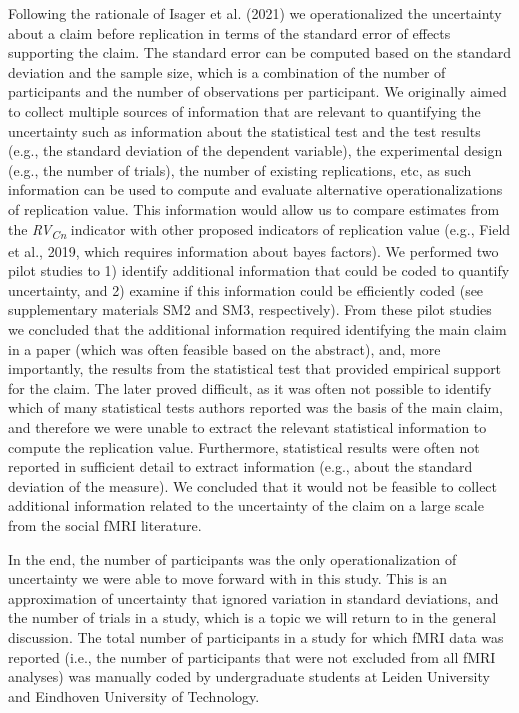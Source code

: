\documentclass[
  man,floatsintext]{apa6}
\begin{document}
Following the rationale of Isager et al. (2021) we operationalized the uncertainty about a claim before replication in terms of the standard error of effects supporting the claim. The standard error can be computed based on the standard deviation and the sample size, which is a combination of the number of participants and the number of observations per participant. We originally aimed to collect multiple sources of information that are relevant to quantifying the uncertainty such as information about the statistical test and the test results (e.g., the standard deviation of the dependent variable), the experimental design (e.g., the number of trials), the number of existing replications, etc, as such information can be used to compute and evaluate alternative operationalizations of replication value. This information would allow us to compare estimates from the \emph{RV\textsubscript{Cn}} indicator with other proposed indicators of replication value (e.g., Field et al., 2019, which requires information about bayes factors). We performed two pilot studies to 1) identify additional information that could be coded to quantify uncertainty, and 2) examine if this information could be efficiently coded (see supplementary materials SM2 and SM3, respectively). From these pilot studies we concluded that the additional information required identifying the main claim in a paper (which was often feasible based on the abstract), and, more importantly, the results from the statistical test that provided empirical support for the claim. The later proved difficult, as it was often not possible to identify which of many statistical tests authors reported was the basis of the main claim, and therefore we were unable to extract the relevant statistical information to compute the replication value. Furthermore, statistical results were often not reported in sufficient detail to extract information (e.g., about the standard deviation of the measure). We concluded that it would not be feasible to collect additional information related to the uncertainty of the claim on a large scale from the social fMRI literature.

In the end, the number of participants was the only operationalization of uncertainty we were able to move forward with in this study. This is an approximation of uncertainty that ignored variation in standard deviations, and the number of trials in a study, which is a topic we will return to in the general discussion. The total number of participants in a study for which fMRI data was reported (i.e., the number of participants that were not excluded from all fMRI analyses) was manually coded by undergraduate students at Leiden University and Eindhoven University of Technology.
\end{document}
